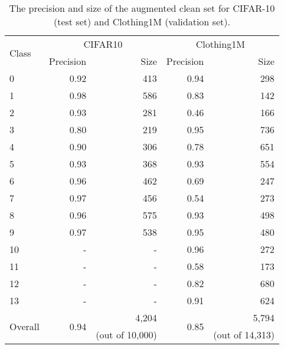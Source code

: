 \documentclass[conference]{IEEEtran}
\begin{document}
\begin{table}[tb]
\caption{The precision and size of the augmented clean set for CIFAR-10 (test set) and Clothing1M (validation set).}
\label{Table of augmented clean set}
\centering
\begin{tabular}{lrr|rr}
\toprule
\multirow{2}{*}{Class} & \multicolumn{2}{c|}{CIFAR10}   & \multicolumn{2}{c}{Clothing1M} \\ \cmidrule{2-5}
 & \multicolumn{1}{r}{Precision} & \multicolumn{1}{r|}{Size} & \multicolumn{1}{r}{Precision} & \multicolumn{1}{r}{Size} \\ \midrule
0   & 0.92   & 413   & 0.94   & 298   \\
1   & 0.98   & 586   & 0.83   & 142   \\
2   & 0.93   & 281   & 0.46   & 166   \\
3   & 0.80   & 219   & 0.95   & 736   \\
4   & 0.90   & 306   & 0.78   & 651   \\
5   & 0.93   & 368   & 0.93   & 554   \\
6   & 0.96   & 462   & 0.69   & 247   \\
7   & 0.97   & 456   & 0.54   & 273   \\
8   & 0.96   & 575   & 0.93   & 498   \\
9   & 0.97   & 538   & 0.95   & 480   \\
10  & - &  - & 0.96   & 272   \\
11  & - &  - & 0.58   & 173   \\
12  & - &  - & 0.82   & 680   \\
13  & - &  - & 0.91   & 624  \\ \midrule
\multirow{2}{*}{Overall} & \multirow{2}{*}{0.94} & 4,204 
& \multirow{2}{*}{0.85} & 5,794  \\
 & & (out of 10,000) & & (out of 14,313) \\
\bottomrule
\end{tabular}
\end{table}
\end{document}
